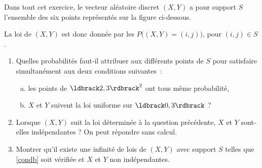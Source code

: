 \documentclass[a4paper,12pt,reqno]{amsart}
\begin{document}
\begin{exo}

  Dans tout cet exercice, le vecteur aléatoire discret $(X,Y)$ a pour support $S$ l'ensemble des six points représentés sur la figure ci-dessous.
  \begin{center}
  \end{center}
  La loi de $(X,Y)$ est donc donnée par les $P\big((X,Y)=(i,j)\big)$, pour $(i,j)\in S$.

  \begin{enumerate}
    \item Quelles probabilités faut-il attribuer aux différents points de $S$ pour satisfaire simultanément aux deux conditions suivantes~:
    \begin{enumerate}[a)]
      \item\label{conda} les points de $\iintv{2,3}^2$ ont tous même probabilité,
      \item\label{condb} $X$ et $Y$ suivent la loi uniforme sur $\iintv{0,3}$ ?
    \end{enumerate}
    \item Lorsque $(X,Y)$ suit la loi déterminée à la question précédente, $X$ et $Y$ sont-elles indépendantes ? On peut répondre sans calcul.
    \item Montrer qu'il existe une infinité de lois de $(X,Y)$ avec support $S$ telles que \ref{condb} soit vérifiée et $X$ et $Y$ non indépendantes.
  \end{enumerate}

\end{exo}
\end{document}
